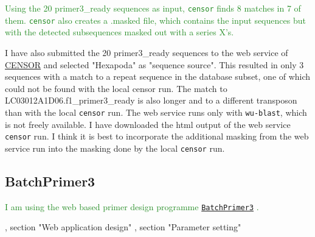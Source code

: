 \documentclass{article}\usepackage[]{graphicx}\usepackage[]{color}
\newcommand{\roger}[1]{ \textcolor[named]{ForestGreen}{#1} }
\begin{document}
\roger{Using the 20 primer3\_ready sequences as input, \texttt{censor} finds 8 matches in 7 of them. \texttt{censor} also creates a .masked file, which contains the input sequences but with the detected subsequences masked out with a series X's.}

I have also submitted the 20 primer3\_ready sequences to the web service of \href{http://www.girinst.org/censor/index.php}{CENSOR} and selected "Hexapoda" as "sequence source". This resulted in only 3 sequences with a match to a repeat sequence in the database subset, one of which could not be found with the local censor run. The match to LC03012A1D06.f1\_primer3\_ready is also longer and to a different transposon than with the local \texttt{censor} run. The web service runs only with \texttt{wu-blast}, which is not freely available. I have downloaded the html output of the web service \texttt{censor} run. I think it is best to incorporate the additional masking from the web service run into the masking done by the local \texttt{censor} run.

\subsection{BatchPrimer3}

\roger{I am using the web based primer design programme \href{http://probes.pw.usda.gov/batchprimer3/}{\texttt{BatchPrimer3}} \citep{You2008}.}
\begin{epigraphs}
{\cite{You2008}, section "Web application design"}
{\cite{You2008}, section "Parameter setting"}
\end{epigraphs}
\end{document}
